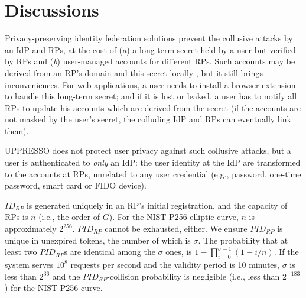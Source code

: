 \section{Discussions}
\label{sec:discussion}

Privacy-preserving identity federation solutions \cite{ELPASSO,UnlimitID,idemix,PseudoID,Opaak,uprov}
 prevent the collusive attacks by an IdP and RPs,
    at the cost of (\emph{a}) a long-term secret held by a user but verified by RPs
        and (\emph{b}) user-managed accounts \cite{PseudoID} for different RPs.
Such accounts may be derived from an RP's domain and this secret locally \cite{ELPASSO,UnlimitID,Opaak,uprov,idemix},
  but it still brings inconveniences.
For web applications, a user needs to install a browser extension to handle this long-term secret;
  and if it is lost or leaked,
       a user has to notify all RPs to update his accounts which are derived from the secret
        (if the accounts are not masked by the user's secret, the colluding IdP and RPs can eventually link them).

UPPRESSO does not protect user privacy against such collusive attacks,
    but a user is authenticated to \emph{only} an IdP:
         the user identity at the IdP
                are transformed to the accounts at RPs, unrelated to any user credential
                 (e.g., password, one-time password, smart card or FIDO device).




\vspace{1mm}
$ID_{RP}$ is generated uniquely in an RP's initial registration,
    and the capacity of RPs is $n$ (i.e., the order of $G$). For the NIST P256 elliptic curve, $n$ is approximately $2^{256}$.
$PID_{RP}$ cannot be exhausted, either.
We ensure $PID_{RP}$ is unique in unexpired tokens,
    the number of which is $\sigma$.
The probability that at least two $PID_{RP}$s are identical among the $\sigma$ ones,
    is $1-\prod_{i=0}^{\sigma-1}(1-i/n)$.
If the system serves $10^{8}$ requests per second and the validity period is 10 minutes,
     $\sigma$ is less than $2^{36}$ and the $PID_{RP}$-collision probability is negligible (i.e., less than $2^{-183}$)
      for the NIST P256 curve.

